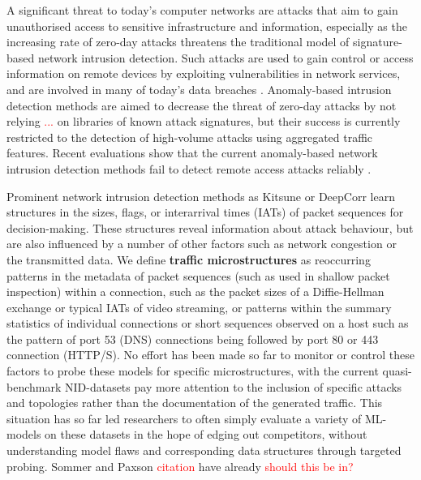 
A significant threat to today's computer networks are attacks that aim to gain unauthorised access to sensitive infrastructure and information, especially as the increasing rate of zero-day attacks \cite{zeroday} threatens the traditional model of signature-based network intrusion detection. Such attacks are used to gain control or access information on remote devices by exploiting vulnerabilities in network services, and are involved in many of today's data breaches \cite{mandiant2015trends}.
Anomaly-based intrusion detection methods are aimed to decrease the threat of zero-day attacks by not relying \textcolor{red}{...} on libraries of known attack signatures, but their success is currently restricted to the detection of high-volume attacks using aggregated traffic features. Recent evaluations show that the current anomaly-based network intrusion detection methods fail to detect remote access attacks reliably \cite{nisioti2018intrusion}. 

Prominent network intrusion detection methods as Kitsune \cite{mirsky2018kitsune} or DeepCorr \cite{nasr2018deepcorr} learn structures in the sizes, flags, or interarrival times (IATs) of packet sequences for decision-making. These structures reveal information about attack behaviour, but are also influenced by a number of other factors such as network congestion or the transmitted data. We define \textbf{traffic microstructures} as reoccurring patterns in the metadata of packet sequences (such as used in shallow packet inspection) within a connection, such as the packet sizes of a Diffie-Hellman exchange or typical IATs of video streaming, or patterns within the summary statistics of individual connections or short sequences observed on a host such as the pattern of port 53 (DNS) connections being followed by port 80 or 443 connection (HTTP/S). No effort has been made so far to monitor or control these factors to probe these models for specific microstructures, with the current quasi-benchmark NID-datasets pay more attention to the inclusion of specific attacks and topologies rather than the documentation of the generated traffic. 
This situation has so far led researchers to often simply evaluate a variety of ML-models on these datasets in the hope of edging out competitors, without understanding model flaws and corresponding data structures through targeted probing.
Sommer and Paxson \textcolor{red}{citation} have already \textcolor{red}{should this be in?}




